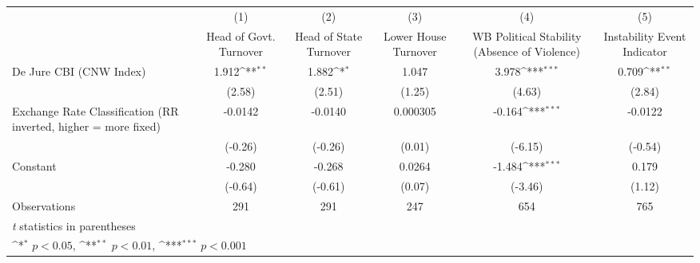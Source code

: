 {
\def\sym#1{\ifmmode^{#1}\else\(^{#1}\)\fi}
\begin{tabular*}{\linewidth}{@{\hskip\tabcolsep\extracolsep\fill}l*{5}{c}}
\hline\hline
                &\multicolumn{1}{c}{(1)}&\multicolumn{1}{c}{(2)}&\multicolumn{1}{c}{(3)}&\multicolumn{1}{c}{(4)}&\multicolumn{1}{c}{(5)}\\
                &\multicolumn{1}{c}{Head of Govt. Turnover}&\multicolumn{1}{c}{Head of State Turnover}&\multicolumn{1}{c}{Lower House Turnover}&\multicolumn{1}{c}{WB Political Stability (Absence of Violence)}&\multicolumn{1}{c}{Instability Event Indicator}\\
\hline
De Jure CBI (CNW Index)&    1.912\sym{**} &    1.882\sym{*}  &    1.047         &    3.978\sym{***}&    0.709\sym{**} \\
                &   (2.58)         &   (2.51)         &   (1.25)         &   (4.63)         &   (2.84)         \\
[1em]
Exchange Rate Classification (RR inverted, higher = more fixed)&  -0.0142         &  -0.0140         & 0.000305         &   -0.164\sym{***}&  -0.0122         \\
                &  (-0.26)         &  (-0.26)         &   (0.01)         &  (-6.15)         &  (-0.54)         \\
[1em]
Constant        &   -0.280         &   -0.268         &   0.0264         &   -1.484\sym{***}&    0.179         \\
                &  (-0.64)         &  (-0.61)         &   (0.07)         &  (-3.46)         &   (1.12)         \\
\hline
Observations    &      291         &      291         &      247         &      654         &      765         \\
\hline\hline
\multicolumn{6}{l}{\footnotesize \textit{t} statistics in parentheses}\\
\multicolumn{6}{l}{\footnotesize \sym{*} \(p<0.05\), \sym{**} \(p<0.01\), \sym{***} \(p<0.001\)}\\
\end{tabular*}
}
